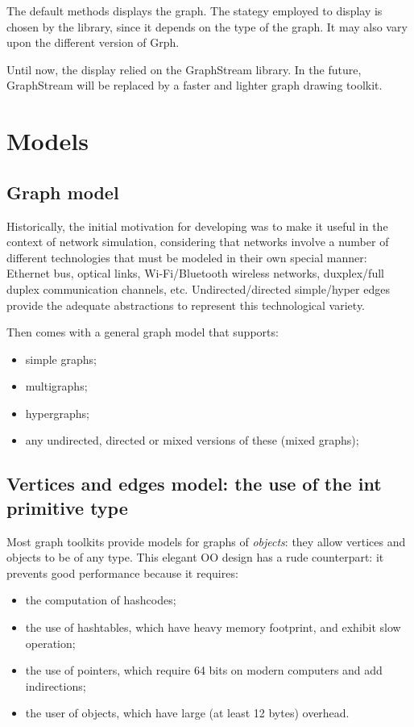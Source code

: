 \documentclass{article}
\begin{document}
The default  methods displays the graph. The stategy employed to display is chosen by the library, since it depends on the type of the graph. It may also vary upon the different version of Grph.

Until now, the display relied on the GraphStream library. In the future, GraphStream will be replaced by
a faster and lighter graph drawing toolkit.


\section{Models}

\subsection{Graph model}
Historically, the initial motivation for developing \grph was to make it useful in the context of network simulation,
considering that networks involve a number of different technologies that must be modeled in their own
special manner: Ethernet bus, optical links, Wi-Fi/Bluetooth wireless networks, duxplex/full duplex communication channels, etc. 
Undirected/directed simple/hyper edges provide the adequate abstractions to represent this technological variety.


Then  \grph comes with a general graph model that supports:
\begin{itemize}
  \item simple graphs;
  \item multigraphs;
  \item hypergraphs;
  \item any undirected, directed or mixed versions of these (mixed graphs);
\end{itemize}


\subsection{Vertices and edges model: the use of the int primitive type}
Most graph toolkits provide models for graphs of \textit{objects}: they allow vertices and objects to  be of any type. This elegant OO design
has a rude counterpart: it prevents good performance because it requires:
\begin{itemize}
  \item the computation of hashcodes;
  \item the use of hashtables, which have heavy memory footprint, and exhibit slow operation;
  \item the use of pointers, which require 64 bits on modern computers and add indirections;
  \item the user of objects, which have large (at least 12 bytes) overhead.
\end{itemize}
\end{document}
